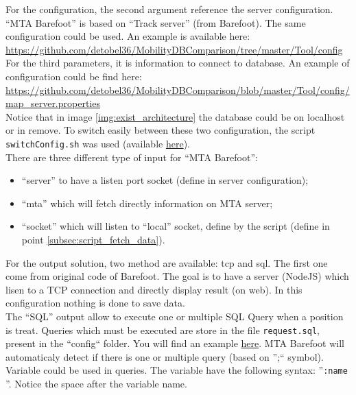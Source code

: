 \documentclass[a4paper,12pt]{article}
\begin{document}
            For the configuration, the second argument reference the server configuration. ``MTA Barefoot'' is based on ``Track server'' (from Barefoot). The same configuration could be used. An example is available here: \url{https://github.com/detobel36/MobilityDBComparison/tree/master/Tool/config}\\
            
            For the third parameters, it is information to connect to database. An example of configuration could be find here: \url{https://github.com/detobel36/MobilityDBComparison/blob/master/Tool/config/map_server.properties}\\
            Notice that in image \ref{img:exist_architecture} the database could be on localhost or in remove. To switch easily between these two configuration, the script \verb|switchConfig.sh| was used (available \href{https://github.com/detobel36/MobilityDBComparison/blob/master/Tool/switchConfig.sh}{here}).\\
            
            There are three different type of input for ``MTA Barefoot'':
            \begin{itemize}
                \item ``server'' to have a listen port socket (define in server configuration);
                \item ``mta'' which will fetch directly information on MTA server;
                \item ``socket'' which will listen to ``local'' socket, define by the script (define in point \ref{subsec:script_fetch_data}).
            \end{itemize}
            
            For the output solution, two method are available: tcp and sql. The first one come from original code of Barefoot. The goal is to have a server (NodeJS) which lisen to a TCP connection and directly display result (on web). In this configuration nothing is done to save data.\\
            The ``SQL'' output allow to execute one or multiple SQL Query when a position is treat. Queries which must be executed are store in the file \verb|request.sql|, present in the ``config`` folder. You will find an example \href{https://github.com/detobel36/MobilityDBComparison/blob/master/Tool/config/request.sql}{here}. MTA Barefoot will automaticaly detect if there is one or multiple query (based on '';`` symbol).\\
            Variable could be used in queries. The variable have the following syntax: ''\verb|:name |''. Notice the space after the variable name.\\
            
\end{document}
